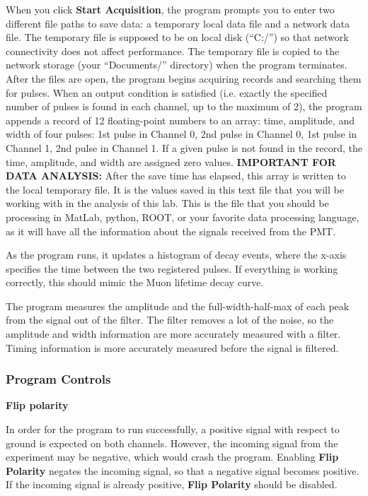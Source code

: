 \documentclass{../lab}
\begin{document}
\newpage

When you click \textbf{Start Acquisition}, the program prompts you to enter two different file paths to save data: a temporary local data file and a network data file. The temporary file is supposed to be on local disk (``C:/'') so that network connectivity does not affect performance. The temporary file is copied to the network storage (your ``Documents/'' directory) when the program terminates. After the files are open, the program begins acquiring records and searching them for pulses. When an output condition is satisfied (i.e. exactly the specified number of pulses is found in each channel, up to the maximum of 2), the program appends a record of 12 floating-point numbers to an array: time, amplitude, and width of four pulses: 1st pulse in Channel 0, 2nd pulse in Channel 0, 1st pulse in Channel 1, 2nd pulse in Channel 1. If a given pulse is not found in the record, the time, amplitude, and width are assigned zero values. \textbf{IMPORTANT FOR DATA ANALYSIS:} After the save time has elapsed, this array is written to the local temporary file. It is the values saved in this text file that you will be working with in the analysis of this lab. This is the file that you should be processing in MatLab, python, ROOT, or your favorite data processing language, as it will have all the information about the signals received from the PMT.

As the program runs, it updates a histogram of decay events, where the x-axis specifies the time between the two registered pulses. If everything is working correctly, this should mimic the Muon lifetime decay curve.

The program measures the amplitude and the full-width-half-max of each peak from the signal out of the filter. The filter removes a lot of the noise, so the amplitude and width information are more accurately measured with a filter. Timing information is more accurately measured before the signal is filtered.

\subsubsection{Program Controls}

\textbf{Flip polarity}

In order for the program to run successfully, a positive signal with respect to ground is expected on both channels. However, the incoming signal from the experiment may be negative, which would crash the program. Enabling \textbf{Flip Polarity} negates the incoming signal, so that a negative signal becomes positive. If the incoming signal is already positive, \textbf{Flip Polarity} should be disabled.
\end{document}

